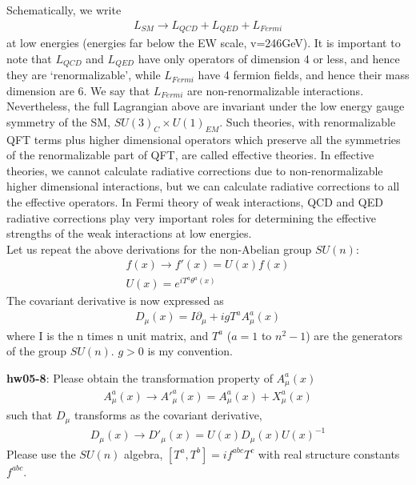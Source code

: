 \documentclass[12pt]{article}
\def\del{{\partial}}
\begin{document}
  Schematically, we write
\begin{eqnarray}
    L_{SM} \to L_{QCD} + L_{QED} + L_{Fermi}
\end{eqnarray}
   at low energies (energies far below the EW scale, v=246GeV).
  It is important to note that $L_{QCD}$ and $L_{QED}$ have only
  operators of dimension 4 or less, and hence they are
  `renormalizable', while $L_{Fermi}$ have 4 fermion fields,
  and hence their mass dimension are 6.  We say that $L_{Fermi}$
  are non-renormalizable interactions.  Nevertheless, the
  full Lagrangian above are invariant under the low energy
  gauge symmetry of the SM,
  $SU(3)_C \times U(1)_{EM}$.
  Such theories, with renormalizable QFT terms plus higher
  dimensional operators which preserve all the symmetries of
  the renormalizable part of QFT, are called effective theories.
  In effective theories, we cannot calculate radiative corrections
  due to non-renormalizable higher dimensional interactions, but
  we can calculate radiative corrections to all the effective
  operators.  In Fermi theory of weak interactions, QCD and
  QED radiative corrections play very important roles for
  determining the effective strengths of the weak interactions
  at low energies.\\
    
  Let us repeat the above derivations for the non-Abelian group
  $SU(n)$:
\begin{eqnarray}
    f(x) \to f'(x) = U(x) f(x) \\
    U(x) = e^{ i T^a \theta^a(x) }
\end{eqnarray}
  The covariant derivative is now expressed as
\begin{eqnarray}
    D_\mu(x) = I \del_\mu + i g T^a A^a_\mu(x)
\end{eqnarray}
  where I is the n times n unit matrix, and $T^a$ ($a = 1$ to $n^2-1$)
  are the generators of the group $SU(n)$.  $g>0$ is my convention.

{\bf hw05-8}:
  Please obtain the transformation property of $A^a_\mu(x)$
\begin{eqnarray}
    A^a_\mu(x)\to A'^a_\mu(x) = A^a_\mu(x) + X^a_\mu(x)
\end{eqnarray}
  such that $D_\mu$ transforms as the covariant derivative,
\begin{eqnarray}
    D_\mu(x) \to D'_\mu(x) = U(x) D_\mu(x) U(x)^{-1}
\end{eqnarray}
  Please use the $SU(n)$ algebra,
$ [ T^a, T^b ] = i f^{abc} T^c$
  with real structure constants $f^{abc}$.
\end{document}

